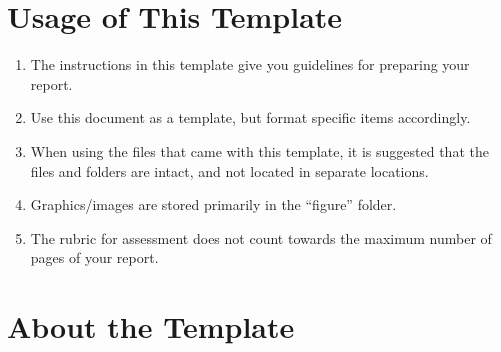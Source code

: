 \section{Usage of This Template}

\begin{enumerate}
	\item The instructions in this template give you guidelines for preparing your report.

	\item Use this document as a template, but format specific items accordingly.
	
	\item When using the files that came with this template, it is suggested that the files and folders are intact, and not located in separate locations.  
	
	\item Graphics/images are stored primarily in the ``figure'' folder. 
	
	\item The rubric for assessment does not count towards the maximum number of pages of your report.
\end{enumerate}




\section{About the Template}

